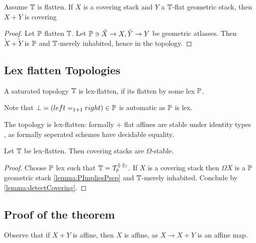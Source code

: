 \begin{lemma}
	Assume $\mathbb{T}$ is flatten.
	If $X$ is a covering stack and $Y$ a $\mathbb{T}$-flat geometric stack, then $X + Y$ is covering
\end{lemma}
\begin{proof}
	Let $\mathbb{P}$ flatten $\mathbb{T}$.
	Let ${\mathbb{P}} \ni \tilde X \to X, \tilde Y \to Y$ be geometric atlasses. Then $\tilde X+ \tilde Y$ is $\mathbb{P}$ and ${\mathbb{T}}$-merely inhabited, hence in the topology.
\end{proof}

\subsection{Lex flatten Topologies}


\begin{definition}
	A saturated topology $\mathbb{T}$ is lex-flatten, if its flatten by some lex $\mathbb{P}$. %
\end{definition}
Note that $\bot = (left =_{1+1} right) \in \mathbb{P}$ is automatic as $\mathbb{P}$ is lex.

\begin{example}
	The \etale topology is lex-flatten:
	formally \etale $+$ flat affines are stable under identity types , as formally \etale seperated schemes have decidable equality.  %
\end{example}

\begin{prop}{\label{prop:LexflattenOmegaStable}}
	Let $\mathbb{T}$ be lex-flatten. Then covering stacks are $\Omega$-stable. %
\end{prop}
\begin{proof}
	Choose $\mathbb{P}$ lex such that $\mathbb{T} = \mathcal{T}_{\mathbb{P}}^{\|\cdot\|_{\mathbb{T}}}$. If $X$ is a covering stack then $\Omega X$ is a $\mathbb{P}$ geometric stack \ref{lemma:PImpliesPsep} and $\mathbb{T}$-merely inhabited. Conclude by  \ref{lemma:detectCovering}.
\end{proof}

\subsection{Proof of the theorem}
 Observe that if $X + Y$ is affine, then $X$ is affine, as $X \to X + Y$ is an affine map.


